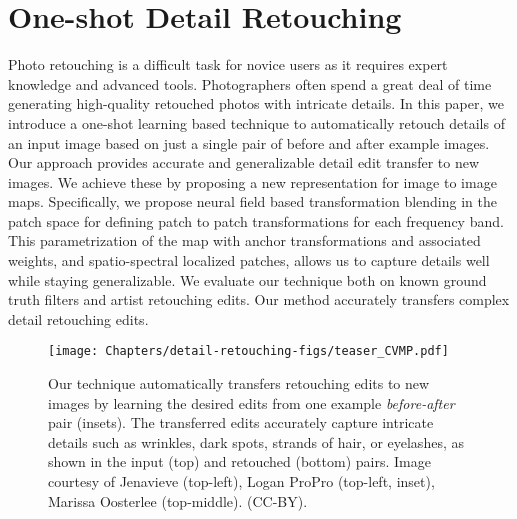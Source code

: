 \chapter{One-shot Detail Retouching}\label{one-shot}

 Photo retouching is a difficult task for novice users as it requires expert knowledge and advanced tools. Photographers often spend a great deal of time generating high-quality retouched photos with intricate details. In this paper, we introduce a one-shot learning based technique to automatically retouch details of an input image based on just a single pair of before and after example images. Our approach provides accurate and generalizable detail edit transfer to new images. We achieve these by proposing a new representation for image to image maps. Specifically, we propose neural field based transformation blending in the patch space for defining patch to patch transformations for each frequency band. This parametrization of the map with anchor transformations and associated weights, and spatio-spectral localized patches, allows us to capture details well while staying generalizable. We evaluate our technique both on known ground truth filters and artist retouching edits. Our method accurately transfers complex detail retouching edits.



\begin{figure}
  \texttt{[image: Chapters/detail-retouching-figs/teaser\_CVMP.pdf]}
  \caption{Our technique automatically transfers retouching edits to new images by learning the desired edits from one example \textit{before-after} pair (insets). The transferred edits accurately capture intricate details such as wrinkles, dark spots, strands of hair, or eyelashes, as shown in the input (top) and retouched (bottom) pairs. Image courtesy of Jenavieve (top-left), Logan ProPro (top-left, inset), Marissa Oosterlee (top-middle). (CC-BY).}
  \label{fig:teaser}
\end{figure}





